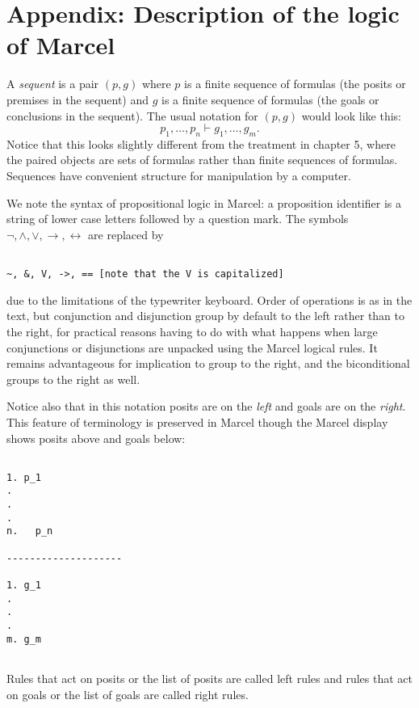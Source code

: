 \documentclass[12pt]{book}
\begin{document}
\newpage

\chapter{Appendix:  Description of the logic of Marcel}

A {\em sequent\/} is a pair $(p,g)$ where $p$ is a finite sequence of formulas (the posits or premises in the sequent) and
$g$ is a finite sequence of formulas (the goals or conclusions in the sequent).  The usual notation for $(p,g)$ would look like this:
$$p_1, \ldots, p_n \vdash g_1,\ldots,g_m.$$  Notice that this looks slightly different from the treatment in chapter 5, where the paired objects are sets of formulas rather than finite sequences of formulas.  Sequences have convenient structure for manipulation by a computer.

We note the syntax of propositional logic in Marcel:  a proposition identifier is a string of lower case letters followed by a question mark.  The symbols
$\neg, \wedge, \vee, \rightarrow, \leftrightarrow$ are replaced by

\begin{verbatim}

~, &, V, ->, == [note that the V is capitalized]

\end{verbatim}

\noindent due to the limitations of the typewriter keyboard.  Order of operations is as in the text, but conjunction and disjunction group by default to the left rather than to the right, for practical reasons having to do with what happens when large conjunctions or disjunctions are unpacked using the Marcel logical rules.  It remains advantageous for implication to group to the right, and the biconditional groups to the right as well.

\newpage

Notice also that in this notation posits are on the {\em left\/} and goals are on the {\em right}.  This feature of terminology is preserved in Marcel though the Marcel display shows posits above and goals below:

\begin{verbatim}

1. p_1
.
.
.
n.   p_n

--------------------

1. g_1
.
.
.
m. g_m


\end{verbatim}

Rules that act on posits or the list of posits are called left rules and rules that act on goals or the list of goals are called right rules.
\end{document}
